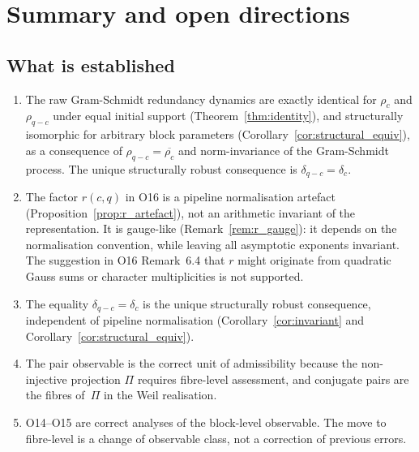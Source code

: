 \documentclass[11pt,a4paper]{article}
\theoremstyle{definition}
\begin{document}
  \section{Summary and open directions}
    \label{sec:summary}

    \subsection{What is established}

      \begin{enumerate}
        \item The raw Gram-Schmidt redundancy dynamics are exactly identical for
        $\rho_c$ and $\rho_{q-c}$ under equal initial support
        (Theorem~\ref{thm:identity}), and structurally isomorphic for
        arbitrary block parameters (Corollary~\ref{cor:structural_equiv}),
        as a consequence of $\rho_{q-c} = \overline{\rho_c}$ and
        norm-invariance of the Gram-Schmidt process.
        The unique structurally robust consequence is $\delta_{q-c} = \delta_c$.

        \item The factor $r(c,q)$ in O16 is a pipeline normalisation
        artefact (Proposition~\ref{prop:r_artefact}), not an
        arithmetic invariant of the representation.
        It is gauge-like (Remark~\ref{rem:r_gauge}): it depends on the
        normalisation convention, while leaving all asymptotic
        exponents invariant.
        The suggestion in O16 Remark~6.4 that $r$ might originate from
        quadratic Gauss sums or character multiplicities is not supported.

        \item The equality $\delta_{q-c} = \delta_c$ is the unique
        structurally robust consequence, independent of pipeline
        normalisation (Corollary~\ref{cor:invariant} and
        Corollary~\ref{cor:structural_equiv}).

        \item The pair observable is the correct unit of admissibility
        because the non-injective projection $\Pi$ requires fibre-level
        assessment, and conjugate pairs are the fibres of~$\Pi$
        in the Weil realisation.

        \item O14--O15 are correct analyses of the block-level observable.
        The move to fibre-level is a change of observable class,
        not a correction of previous errors.
      \end{enumerate}
\end{document}
